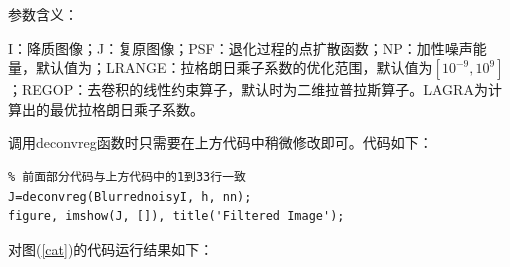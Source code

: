 \documentclass[UTF8]{ctexart}
\begin{document}
    参数含义：

    {\ttfamily I}：降质图像；{\ttfamily J}：复原图像；{\ttfamily PSF}：退化过程的点扩散函数；{\ttfamily NP}：加性噪声能量，默认值为{}；{\ttfamily LRANGE}：拉格朗日乘子系数的优化范围，默认值为$[10^{-9},10^9]$；{\ttfamily REGOP}：去卷积的线性约束算子，默认时为二维拉普拉斯算子。{\ttfamily LAGRA}为计算出的最优拉格朗日乘子系数。

    调用{\ttfamily deconvreg}函数时只需要在上方代码中稍微修改即可。代码如下：
    \begin{lstlisting}
% 前面部分代码与上方代码中的1到33行一致
J=deconvreg(BlurrednoisyI, h, nn);
figure, imshow(J, []), title('Filtered Image');
    \end{lstlisting}

    对图(\ref{cat})的代码运行结果如下：
    \begin{figure}[htbp]
        \centering
\end{figure}
\end{document}
